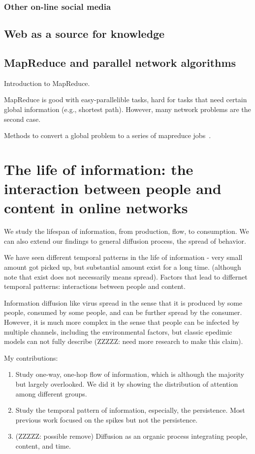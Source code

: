 \documentclass[phd,tocprelim]{cornell}
\begin{document}
\subsection{Other on-line social media}

\section{Web as a source for knowledge}


\section{MapReduce and parallel network algorithms}
Introduction to MapReduce.

MapReduce is good with easy-parallelible tasks, hard for tasks that need certain global information (e.g., shortest path). However, many network problems are the second case. 

Methods to convert a global problem to a series of mapreduce jobs~\cite{Suri-Triangle-2011}.


\chapter{The life of information: the interaction between people and content in online networks}

We study the lifespan of information, from production, flow, to consumption. We can also extend our findings to general diffusion process, the spread of behavior.

We have seen different temporal patterns in the life of information - very small amount got picked up, but substantial amount exist for a long time. (although note that exist does not necessarily means spread). Factors that lead to differnet temporal patterns: interactions between people and content.

Information diffusion like virus spread in the sense that it is produced by some people, consumed by some people, and can be further spread by the consumer. However, it is much more complex in the sense that people can be infected by multiple channels, including the environmental factors, but classic epedimic models can not fully describe (ZZZZZ: need more research to make this claim).

My contributions:
\begin{enumerate}
\item Study one-way, one-hop flow of information, which is although the majority but largely overlooked. We did it by showing the distribution of attention among different groups.
\item Study the temporal pattern of information, especially, the persistence. Most previous work focused on the spikes but not the persistence.
\item (ZZZZZ: possible remove) Diffusion as an organic process integrating people, content, and time.
\end{enumerate}
\end{document}
